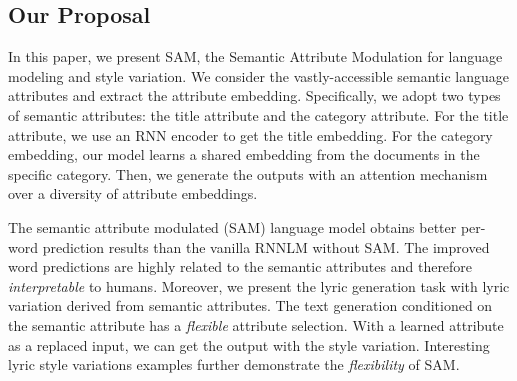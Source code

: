 \documentclass[a4paper]{article}
\newcommand{\method}{\xspace{SAM}}
\begin{document}
\subsection{Our Proposal}
In this paper, we present \method, the Semantic Attribute Modulation for language modeling and style variation.
We consider the vastly-accessible semantic language attributes and extract the attribute embedding.
Specifically, we adopt two types of semantic attributes: the title attribute and the category attribute. For the title attribute, we use an RNN encoder to get the title embedding. For the category embedding, our model learns a shared embedding from the documents in the specific category. Then, we generate the outputs with an attention mechanism over a diversity of attribute embeddings.


The semantic attribute modulated (\method) language model obtains better per-word prediction results than the vanilla RNNLM without \method. The improved word predictions are highly related to the semantic attributes and therefore \emph{interpretable} to humans. Moreover, we present the lyric generation task with lyric variation derived from semantic attributes. The text generation conditioned on the semantic attribute has a \emph{flexible} attribute selection.
With a learned attribute as a replaced input, we can get the output with the style variation. Interesting lyric style variations examples further demonstrate the \emph{flexibility} of \method.




\end{document}
